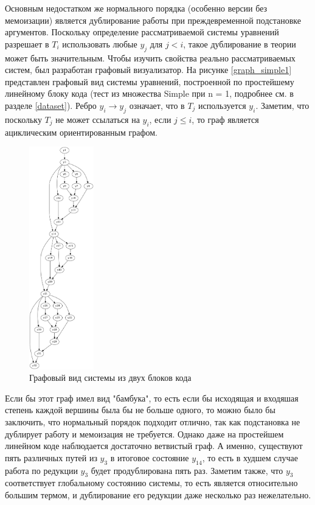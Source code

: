 \documentclass[../thesis.tex]{subfiles}
\begin{document}
Основным недостатком же нормального порядка (особенно версии без мемоизации) является дублирование работы при преждевременной подстановке аргументов. Поскольку определение рассматриваемой системы уравнений разрешает в $T_i$ использовать любые $y_j$ для $j < i$, такое дублирование в теории может быть значительным. Чтобы изучить свойства реально рассматриваемых систем, был разработан графовый визуализатор. На рисунке \ref{graph_simple1} представлен графовый вид системы уравнений, построенной по простейшему линейному блоку кода (тест из множества Simple при n = 1, подробнее см. в разделе \ref{dataset}). Ребро $y_i \rightarrow y_j$ означает, что в $T_j$ используется $y_i$. Заметим, что поскольку $T_j$ не может ссылаться на $y_i$, если $j \le i$, то граф является ациклическим ориентированным графом. 

\begin{figure}
    \centering
    \includegraphics[width=0.25\textwidth]{graph_simple2.png}
    \caption{Графовый вид системы из двух блоков кода}\label{graph_simple2}
\end{figure}

Если бы этот граф имел вид "бамбука", то есть если бы исходящая и входяшая степень каждой вершины была бы не больше одного, то можно было бы заключить, что нормальный порядок подходит отлично, так как подстановка не дублирует работу и мемоизация не требуется. Однако даже на простейшем линейном коде наблюдается достаточно ветвистый граф. А именно, существуют пять различных путей из $y_3$ в итоговое состояние $y_{14}$, то есть в худшем случае работа по редукции $y_3$ будет продублирована пять раз. Заметим также, что $y_3$ соответствует глобальному состоянию системы, то есть является относительно большим термом, и дублирование его редукции даже несколько раз нежелательно.
\end{document}
